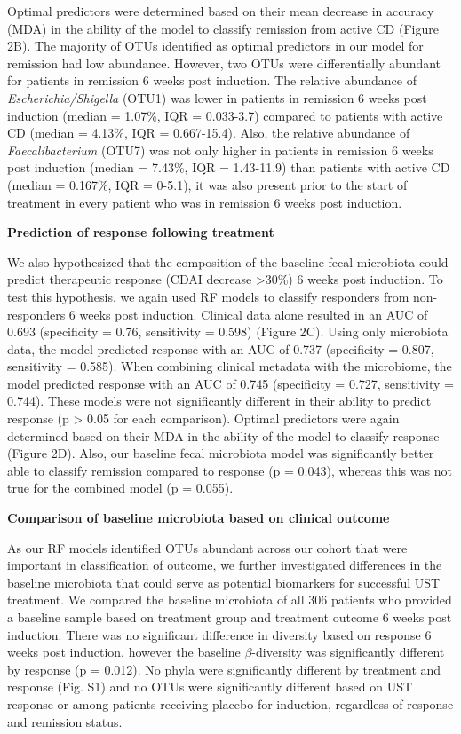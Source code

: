 \documentclass[12pt,]{article}
\begin{document}
Optimal predictors were determined based on their mean decrease in
accuracy (MDA) in the ability of the model to classify remission from
active CD (Figure 2B). The majority of OTUs identified as optimal
predictors in our model for remission had low abundance. However, two
OTUs were differentially abundant for patients in remission 6 weeks post
induction. The relative abundance of \emph{Escherichia/Shigella} (OTU1)
was lower in patients in remission 6 weeks post induction (median =
1.07\%, IQR = 0.033-3.7) compared to patients with active CD (median =
4.13\%, IQR = 0.667-15.4). Also, the relative abundance of
\emph{Faecalibacterium} (OTU7) was not only higher in patients in
remission 6 weeks post induction (median = 7.43\%, IQR = 1.43-11.9) than
patients with active CD (median = 0.167\%, IQR = 0-5.1), it was also
present prior to the start of treatment in every patient who was in
remission 6 weeks post induction.

\textbf{Prediction of response following treatment}

We also hypothesized that the composition of the baseline fecal
microbiota could predict therapeutic response (CDAI decrease
\textgreater{}30\%) 6 weeks post induction. To test this hypothesis, we
again used RF models to classify responders from non-responders 6 weeks
post induction. Clinical data alone resulted in an AUC of 0.693
(specificity = 0.76, sensitivity = 0.598) (Figure 2C). Using only
microbiota data, the model predicted response with an AUC of 0.737
(specificity = 0.807, sensitivity = 0.585). When combining clinical
metadata with the microbiome, the model predicted response with an AUC
of 0.745 (specificity = 0.727, sensitivity = 0.744). These models were
not significantly different in their ability to predict response (p
\textgreater{} 0.05 for each comparison). Optimal predictors were again
determined based on their MDA in the ability of the model to classify
response (Figure 2D). Also, our baseline fecal microbiota model was
significantly better able to classify remission compared to response (p
= 0.043), whereas this was not true for the combined model (p = 0.055).

\textbf{Comparison of baseline microbiota based on clinical outcome}

As our RF models identified OTUs abundant across our cohort that were
important in classification of outcome, we further investigated
differences in the baseline microbiota that could serve as potential
biomarkers for successful UST treatment. We compared the baseline
microbiota of all 306 patients who provided a baseline sample based on
treatment group and treatment outcome 6 weeks post induction. There was
no significant difference in diversity based on response 6 weeks post
induction, however the baseline \({\beta}\)-diversity was significantly
different by response (p = 0.012). No phyla were significantly different
by treatment and response (Fig. S1) and no OTUs were significantly
different based on UST response or among patients receiving placebo for
induction, regardless of response and remission status.
\end{document}
